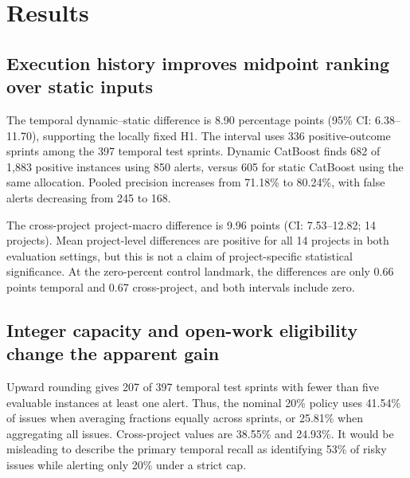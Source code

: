 \section{Results}\label{results}

\subsection{Execution history improves midpoint ranking over static inputs}\label{execution-history-improves-midpoint-ranking-over-static-inputs}

{\def\LTcaptype{table}

}

The temporal dynamic--static difference is 8.90 percentage points (95\% CI: 6.38--11.70), supporting the locally fixed H1. The interval uses 336 positive-outcome sprints among the 397 temporal test sprints. Dynamic CatBoost finds 682 of 1,883 positive instances using 850 alerts, versus 605 for static CatBoost using the same allocation. Pooled precision increases from 71.18\% to 80.24\%, with false alerts decreasing from 245 to 168.

The cross-project project-macro difference is 9.96 points (CI: 7.53--12.82; 14 projects). Mean project-level differences are positive for all 14 projects in both evaluation settings, but this is not a claim of project-specific statistical significance. At the zero-percent control landmark, the differences are only 0.66 points temporal and 0.67 cross-project, and both intervals include zero.



\subsection{Integer capacity and open-work eligibility change the apparent gain}\label{integer-capacity-and-open-work-eligibility-change-the-apparent-gain}

{\def\LTcaptype{table}

}

Upward rounding gives 207 of 397 temporal test sprints with fewer than five evaluable instances at least one alert. Thus, the nominal 20\% policy uses 41.54\% of issues when averaging fractions equally across sprints, or 25.81\% when aggregating all issues. Cross-project values are 38.55\% and 24.93\%. It would be misleading to describe the primary temporal recall as identifying 53\% of risky issues while alerting only 20\% under a strict cap.

